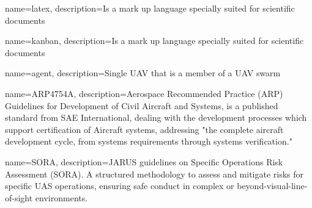 \glstoctrue
\makeglossaries

{
        name=latex,
        description={Is a mark up language specially suited for scientific documents}
}

{
        name=kanban,
        description={Is a mark up language specially suited for scientific documents}
}

{
        name=agent,
        description={Single UAV that is a member of a UAV swarm}
}

{
        name=ARP4754A,
        description={Aerospace Recommended Practice (ARP) Guidelines for Development of Civil Aircraft and Systems, is a published standard from SAE International, dealing with the development processes which support certification of Aircraft systems, addressing "the complete aircraft development cycle, from systems requirements through systems verification."}
}

{
        name=SORA,
        description={JARUS guidelines on Specific Operations Risk Assessment (SORA). A structured methodology to assess and mitigate risks for specific UAS operations, ensuring safe conduct in complex or beyond-visual-line-of-sight environments.}
}



%
